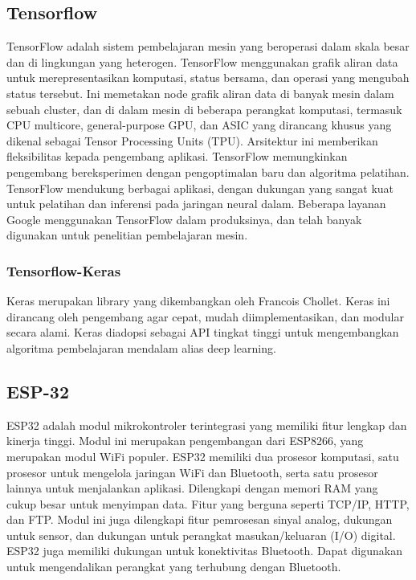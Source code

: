 \subsection{Tensorflow}
TensorFlow adalah sistem pembelajaran mesin yang beroperasi dalam skala besar dan di lingkungan yang heterogen. TensorFlow menggunakan grafik aliran data untuk merepresentasikan komputasi, status bersama, dan operasi yang mengubah status tersebut. Ini memetakan node grafik aliran data di banyak mesin dalam sebuah cluster, dan di dalam mesin di beberapa perangkat komputasi, termasuk CPU multicore, general-purpose GPU, dan ASIC yang dirancang khusus yang dikenal sebagai Tensor Processing Units (TPU). Arsitektur ini memberikan fleksibilitas kepada pengembang aplikasi. TensorFlow memungkinkan pengembang bereksperimen dengan pengoptimalan baru dan algoritma pelatihan. TensorFlow mendukung berbagai aplikasi, dengan dukungan yang sangat kuat untuk pelatihan dan inferensi pada jaringan neural dalam. Beberapa layanan Google menggunakan TensorFlow dalam produksinya, dan telah banyak digunakan untuk penelitian pembelajaran mesin.\
\subsubsection{Tensorflow-Keras}
Keras merupakan library yang dikembangkan oleh Francois Chollet. Keras ini dirancang oleh pengembang agar cepat, mudah diimplementasikan, dan modular secara alami. Keras diadopsi sebagai API tingkat tinggi untuk mengembangkan algoritma pembelajaran mendalam alias deep learning. 

\subsection{ESP-32}
ESP32 adalah modul mikrokontroler terintegrasi yang memiliki fitur lengkap dan kinerja tinggi. Modul ini merupakan pengembangan dari ESP8266, yang merupakan modul WiFi populer. ESP32 memiliki dua prosesor komputasi, satu prosesor untuk mengelola jaringan WiFi dan Bluetooth, serta satu prosesor lainnya untuk menjalankan aplikasi. Dilengkapi dengan memori RAM yang cukup besar untuk menyimpan data. Fitur yang berguna seperti TCP/IP, HTTP, dan FTP. Modul ini juga dilengkapi fitur pemrosesan sinyal analog, dukungan untuk sensor, dan dukungan untuk perangkat masukan/keluaran (I/O) digital. ESP32 juga memiliki dukungan untuk konektivitas Bluetooth. Dapat digunakan untuk mengendalikan perangkat yang terhubung dengan Bluetooth.